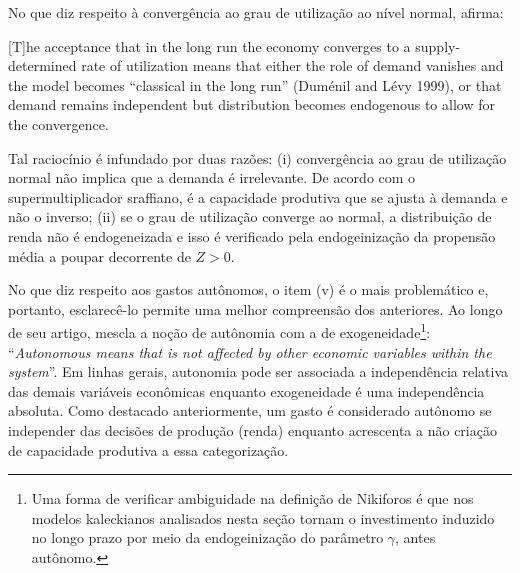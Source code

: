 No que diz respeito à convergência ao grau de utilização ao nível normal, \citeauthor*{nikiforos_comments_2018} afirma:

\begin{citacao}
	
	[T]he acceptance that in the long run the economy converges to a supply-determined rate of utilization means that either the role of demand vanishes and the model becomes ``classical in the long run'' (Duménil and Lévy 1999), or that demand remains independent but distribution becomes endogenous to allow for the convergence. \cite[p.~9]{nikiforos_comments_2018}
\end{citacao}
Tal raciocínio é infundado por duas razões: (i) convergência ao grau de utilização normal não implica que a demanda é irrelevante. De acordo com o supermultiplicador sraffiano, é a capacidade produtiva que se ajusta à demanda e não o inverso; (ii) se o grau de utilização converge ao normal, a distribuição de renda não é endogeneizada e isso é verificado pela endogeinização da propensão média a poupar decorrente de $Z>0$.

No que diz respeito aos gastos autônomos, o item (v) é o mais problemático e, portanto, esclarecê-lo permite uma melhor compreensão dos anteriores. Ao longo de seu artigo, \textcite[p.~4]{nikiforos_comments_2018} mescla a noção de autônomia com a de exogeneidade\footnote{Uma forma de verificar ambiguidade na definição de Nikiforos é que nos modelos kaleckianos analisados nesta seção tornam o investimento induzido no longo prazo por meio da endogeinização do parâmetro $\gamma$, antes autônomo. }: ``\textit{Autonomous means that is not affected by other economic variables within the system}''. Em linhas gerais, autonomia pode ser associada a independência relativa das demais variáveis econômicas enquanto exogeneidade é uma independência absoluta. Como destacado anteriormente, um gasto é considerado autônomo se independer das decisões de produção (renda) enquanto \textcite{serrano_sraffian_1995} acrescenta a não criação de capacidade produtiva a essa categorização. 


